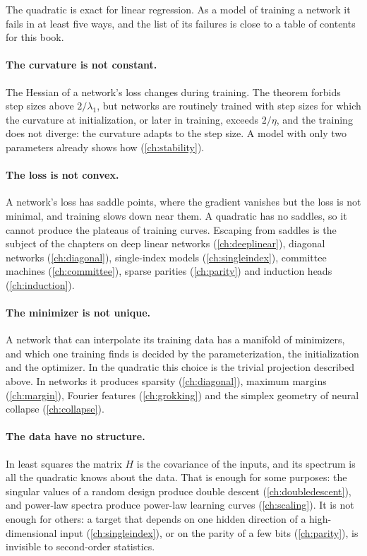 \begin{refsection}
The quadratic is exact for linear regression. As a model of training a network it fails in at least five ways, and the list of its failures is close to a table of contents for this book.

\paragraph{The curvature is not constant.} The Hessian of a network's loss changes during training. The theorem forbids step sizes above $2/\lambda_1$, but networks are routinely trained with step sizes for which the curvature at initialization, or later in training, exceeds $2/\eta$, and the training does not diverge: the curvature adapts to the step size. A model with only two parameters already shows how (\cref{ch:stability}).

\paragraph{The loss is not convex.} A network's loss has saddle points, where the gradient vanishes but the loss is not minimal, and training slows down near them. A quadratic has no saddles, so it cannot produce the plateaus of training curves. Escaping from saddles is the subject of the chapters on deep linear networks (\cref{ch:deeplinear}), diagonal networks (\cref{ch:diagonal}), single-index models (\cref{ch:singleindex}), committee machines (\cref{ch:committee}), sparse parities (\cref{ch:parity}) and induction heads (\cref{ch:induction}).

\paragraph{The minimizer is not unique.} A network that can interpolate its training data has a manifold of minimizers, and which one training finds is decided by the parameterization, the initialization and the optimizer. In the quadratic this choice is the trivial projection described above. In networks it produces sparsity (\cref{ch:diagonal}), maximum margins (\cref{ch:margin}), Fourier features (\cref{ch:grokking}) and the simplex geometry of neural collapse (\cref{ch:collapse}).

\paragraph{The data have no structure.} In least squares the matrix $H$ is the covariance of the inputs, and its spectrum is all the quadratic knows about the data. That is enough for some purposes: the singular values of a random design produce double descent (\cref{ch:doubledescent}), and power-law spectra produce power-law learning curves (\cref{ch:scaling}). It is not enough for others: a target that depends on one hidden direction of a high-dimensional input (\cref{ch:singleindex}), or on the parity of a few bits (\cref{ch:parity}), is invisible to second-order statistics.


\end{refsection}
